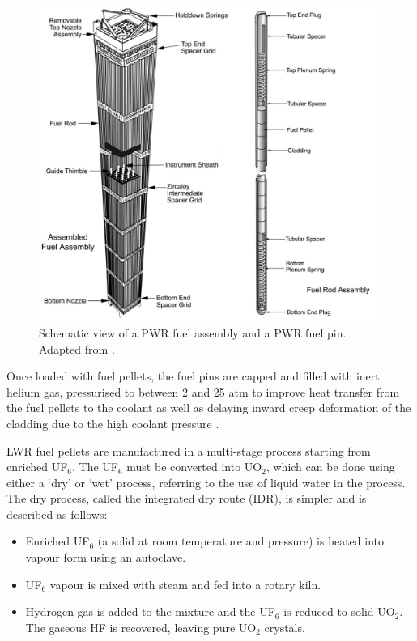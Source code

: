 \begin{figure}[ht]
\centering
\includegraphics[width=11cm]{images/fuelassembly.png}
\caption[Schematic view of a PWR fuel assembly and a PWR fuel pin.]{Schematic view of a PWR fuel assembly and a PWR fuel pin. Adapted from \cite{Croff2003}.}
\label{figure:fuelassembly}
\end{figure} 

Once loaded with fuel pellets, the fuel pins are capped and filled with inert helium gas, pressurised to between 2 and 25 atm to improve heat transfer from the fuel pellets to the coolant as well as delaying inward creep deformation of the cladding due to the high coolant pressure \cite{King1980}. 

LWR fuel pellets are manufactured in a multi-stage process starting from enriched UF$_{6}$. The UF$_{6}$ must be converted into UO$_{2}$, which can be done using either a `dry' or `wet' process, referring to the use of liquid water in the process. The dry process, called the integrated dry route (IDR), is simpler and is described as follows:

\begin{itemize}
\item Enriched UF$_{6}$ (a solid at room temperature and pressure) is heated into vapour form using an autoclave.
\item UF$_{6}$ vapour is mixed with steam and fed into a rotary kiln.
\item Hydrogen gas is added to the mixture and the UF$_{6}$ is reduced to solid UO$_{2}$. The gaseous HF is recovered, leaving pure UO$_{2}$ crystals.
\end{itemize}


